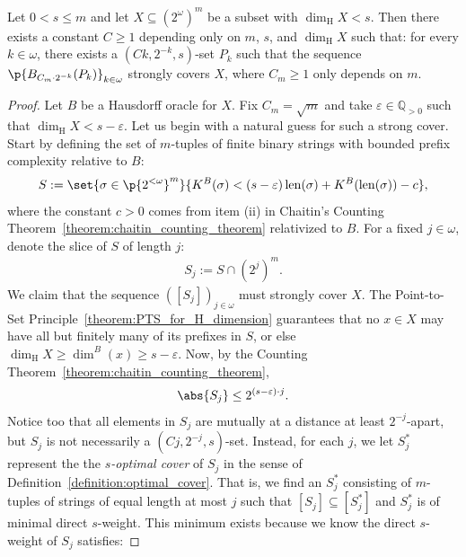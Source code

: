 \begin{proposition}
    Let $0 < s \leq m$ and let $X \subseteq (2^{\omega})^m$ be a subset with $\dim_{\operatorname{H}} X < s$. Then there exists a constant $C \geq 1$ depending only on $m$, $s$, and $\dim_{\operatorname{H}} X$ such that: for every $k \in \omega$, there exists a $(Ck, 2^{-k}, s)$-set $P_k$ such that the sequence $\p{B_{C_m \cdot 2^{-k}}(P_k)}_{k \in \omega}$ strongly covers $X$, where $C_m \geq 1$ only depends on $m$.
    \label{proposition:Katz_Tao_restated}
\end{proposition}
\begin{proof}
    Let $B$ be a Hausdorff oracle for $X$. Fix $C_m = \sqrt{m}$ and take $\varepsilon \in \mathbb{Q}_{> 0}$ such that $\operatorname{dim}_{\operatorname{H}} X < s - \varepsilon$. Let us begin with a natural guess for such a strong cover. Start by defining the set of $m$-tuples of finite binary strings with bounded prefix complexity relative to $B$: 
    \begin{align*}
        S := \set{\sigma \in \p{2^{< \omega}}^m}{K^B(\sigma) < (s - \varepsilon) \operatorname{len}(\sigma) + K^B(\operatorname{len}(\sigma)) - c},
    \end{align*}
    where the constant $c > 0$ comes from item (ii) in Chaitin's Counting Theorem~\ref{theorem:chaitin_counting_theorem} relativized to $B$. For a fixed $j \in \omega$, denote the slice of $S$ of length $j$:
    \begin{align*}
        S_j := S \cap (2^{j})^m.
    \end{align*}
    We claim that the sequence $([S_j])_{j \in \omega}$
    must strongly cover $X$. The Point-to-Set Principle~\ref{theorem:PTS_for_H_dimension} guarantees that no $x \in X$ may have all but finitely many of its prefixes in $S$, or else $\dim_{\operatorname{H}} X \geq \dim^B(x) \geq s - \varepsilon$. Now, by the Counting Theorem~\ref{theorem:chaitin_counting_theorem}, 
    \begin{align*}
        \abs{S_j} \leq 2^{(s - \varepsilon) \cdot j}.
    \end{align*}
    Notice too that all elements in $S_j$ are mutually at a distance at least $2^{-j}$-apart, but $S_j$ is not necessarily a $(Cj, 2^{-j}, s)$-set. Instead, for each $j$, we let $S^*_j$ represent the the \textit{$s$-optimal cover} of $S_j$ in the sense of Definition~\ref{definition:optimal_cover}. That is, we find an $S^*_j$ consisting of $m$-tuples of strings of equal length at most $j$ such that $[S_j] \subseteq [S^*_j]$ and $S^*_j$ is of minimal direct $s$-weight. This minimum exists because we know the direct $s$-weight of $S_j$ satisfies:

\end{proof}
